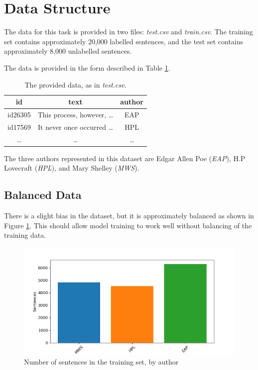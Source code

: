\section{Data Structure}
\label{sec:data_structure}
The data for this task is provided in two files: \textit{test.csv} and \textit{train.csv}. The training set contains approximately 20,000 labelled sentences, and the test set contains approximately 8,000 unlabelled sentences.

The data is provided in the form described in Table \ref{tab:data_form}.

\begin{table}[h]
\centering
\begin{tabular}{|c|c|c|}
\hline 
\textbf{id} & \textbf{text} & \textbf{author} \\ 
\hline 
id26305 & This process, however, \ldots & EAP \\ 
\hline 
id17569 & It never once occurred \ldots & HPL \\ 
\hline 
\ldots & \ldots & \ldots \\ 
\hline 
\end{tabular} 
\caption{The provided data, as in \textit{test.csv}.}
\label{tab:data_form}
\end{table}
The three authors represented in this dataset are Edgar Allen Poe (\textit{EAP}), H.P Lovecraft (\textit{HPL}), and Mary Shelley (\textit{MWS}).

\subsection{Balanced Data}
\label{sec:balanced_data}

There is a slight bias in the dataset, but it is approximately balanced as shown in Figure \ref{fig:balance}. This should allow model training to work well without balancing of the training data.

\begin{figure}[h]
\centering
\includegraphics[width=\columnwidth]{Figures/Data_Structure/balance.png}
\caption{Number of sentences in the training set, by author}
\label{fig:balance}
\end{figure}

